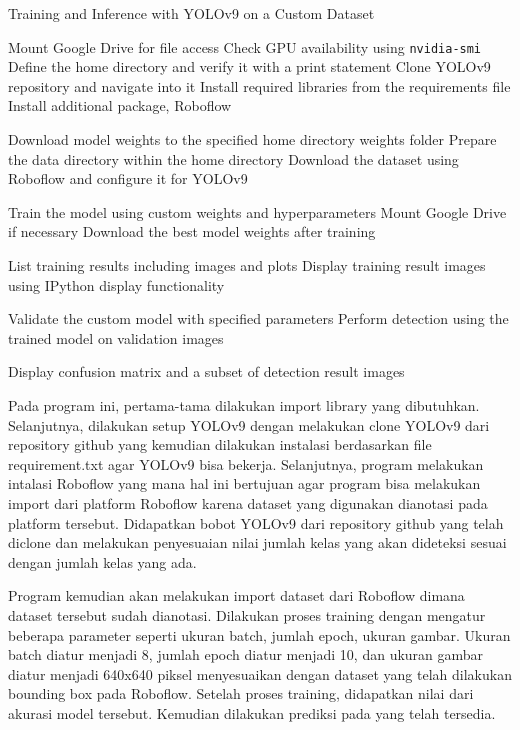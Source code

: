 \begin{algorithm}
  \caption{Training and Inference with YOLOv9 on a Custom Dataset}
  \begin{algorithmic}[1]
  \State Mount Google Drive for file access
  \State Check GPU availability using \texttt{nvidia-smi}
  \State Define the home directory and verify it with a print statement
  \State Clone YOLOv9 repository and navigate into it
  \State Install required libraries from the requirements file
  \State Install additional package, Roboflow
  
  \State Download model weights to the specified home directory weights folder
  \State Prepare the data directory within the home directory
  \State Download the dataset using Roboflow and configure it for YOLOv9
  
  \State Train the model using custom weights and hyperparameters
  \State Mount Google Drive if necessary
  \State Download the best model weights after training
  
  \State List training results including images and plots
  \State Display training result images using IPython display functionality
  
  \State Validate the custom model with specified parameters
  \State Perform detection using the trained model on validation images
  
  \State Display confusion matrix and a subset of detection result images
  \end{algorithmic}
\end{algorithm}

Pada program ini, pertama-tama dilakukan import library yang dibutuhkan. Selanjutnya, dilakukan setup YOLOv9 dengan melakukan clone YOLOv9 dari repository github yang kemudian dilakukan instalasi berdasarkan file requirement.txt agar YOLOv9 bisa bekerja. Selanjutnya, program melakukan intalasi Roboflow yang mana hal ini bertujuan agar program bisa melakukan import dari platform Roboflow karena dataset yang digunakan dianotasi pada platform tersebut. Didapatkan bobot YOLOv9 dari repository github yang telah diclone dan melakukan penyesuaian nilai jumlah kelas yang akan dideteksi sesuai dengan jumlah kelas yang ada.

Program kemudian akan melakukan import dataset dari Roboflow dimana dataset tersebut sudah dianotasi. Dilakukan proses training dengan mengatur beberapa parameter seperti ukuran batch, jumlah epoch, ukuran gambar. Ukuran batch diatur menjadi 8, jumlah epoch diatur menjadi 10, dan ukuran gambar diatur menjadi 640x640 piksel menyesuaikan dengan dataset yang telah dilakukan bounding box pada Roboflow. Setelah proses training, didapatkan nilai dari akurasi model tersebut. Kemudian dilakukan prediksi pada yang telah tersedia.